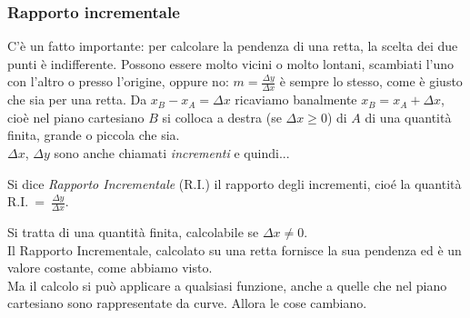 \subsubsection{Rapporto incrementale}
\label{subsubsec:diff01_rappincr}
C'è un fatto importante: per calcolare la pendenza di una retta, 
la scelta dei due punti è indifferente. Possono essere molto vicini o molto 
lontani, scambiati l'uno con l'altro o presso l'origine, oppure no:
$m=\frac{\Delta y}{\Delta x}$ è sempre lo stesso, come è giusto che sia per 
una retta.
Da $x_B-x_A=\Delta x$ ricaviamo banalmente $x_B=x_A+\Delta x$, cioè nel piano 
cartesiano
$B$ si colloca a destra (se $\Delta x\ge 0$) di $A$ di una quantità finita,
grande o piccola che sia.\\
$\Delta x$, $\Delta y$ sono anche chiamati \emph{incrementi} e quindi...
\begin{definizione}
  Si dice \emph{Rapporto Incrementale} (R.I.) il rapporto degli
  incrementi, cioé la quantità R.I.~=~$\frac{\Delta y}{\Delta x}$.
\end{definizione}
Si tratta di una quantità finita, calcolabile se $\Delta x \ne 0$.\\
Il Rapporto Incrementale, calcolato su una retta fornisce la sua pendenza ed 
è un valore costante, come abbiamo visto.\\
Ma il calcolo si può applicare a qualsiasi funzione, anche a quelle che nel 
piano cartesiano sono rappresentate da curve. Allora le cose cambiano.\\


